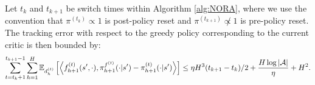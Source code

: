 \begin{lem}
Let $t_k$ and $t_{k+1}$ be switch times within Algorithm \ref{alg:NORA}, where we use the convention that $\pi^{(t_k)} \propto 1$ is post-policy reset and $\pi^{(t_{k+1})} \not\propto 1$ is pre-policy reset. The tracking error with respect to the greedy policy corresponding to the current critic is then bounded by:
    \begin{align*}
        \sum_{t=t_k+1}^{t_{k+1}-1} \sum_{h=1}^H \mathbb{E}_{d_h^{(t)}}\left[\left\langle f_{h+1}^{(t)}(s', \cdot) , \pi_{h+1}^{f^{(t)}}(\cdot | s') - \pi_{h+1}^{(t)} (\cdot | s')\right\rangle\right] \leq \eta H^3 (t_{k+1} - t_k)/2 + \frac{H\log|{\mathcal{A}}|}{\eta} + H^2.
    \end{align*}
    \label{lem:policy-tracking-ft-t-nora}
\end{lem}
